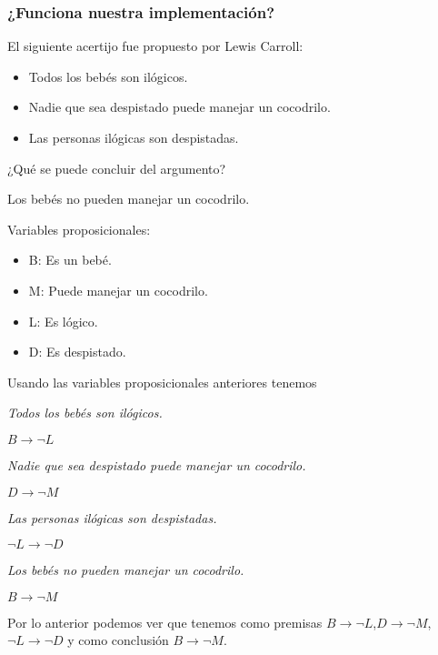 \documentclass[
]{article}
\begin{document}
\hypertarget{funciona-nuestra-implementaciuxf3n}{%
\subsubsection{¿Funciona nuestra
implementación?}\label{funciona-nuestra-implementaciuxf3n}}

El siguiente acertijo fue propuesto por Lewis Carroll:

\begin{itemize}
\item
  Todos los bebés son ilógicos.
\item
  Nadie que sea despistado puede manejar un cocodrilo.
\item
  Las personas ilógicas son despistadas.
\end{itemize}

¿Qué se puede concluir del argumento?

\begin{center}

Los bebés no pueden manejar un cocodrilo.
\end{center}

Variables proposicionales:

\begin{itemize}
\item
  B: Es un bebé.
\item
  M: Puede manejar un cocodrilo.
\item
  L: Es lógico.
\item
  D: Es despistado.
\end{itemize}

Usando las variables proposicionales anteriores tenemos

\begin{center}

\textit{Todos los bebés son ilógicos.}

$B\rightarrow \neg L$

\textit{Nadie que sea despistado puede manejar un cocodrilo.}

$D\rightarrow\neg M$

\textit{Las personas ilógicas son despistadas.}

$\neg L\rightarrow\neg D$

\textit{Los bebés no pueden manejar un cocodrilo.}

$B\rightarrow\neg M$

\end{center}

Por lo anterior podemos ver que tenemos como premisas
\(B\rightarrow \neg L\),\(D\rightarrow\neg M\),\(\neg L\rightarrow\neg D\)
y como conclusión \(B\rightarrow\neg M\).
\end{document}
